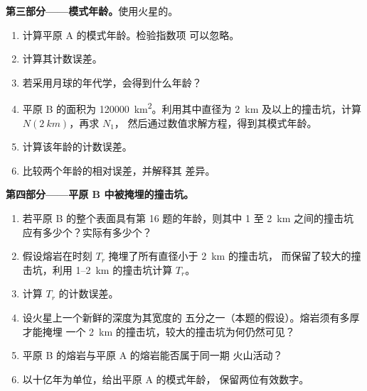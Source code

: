 \begin{problem}
\medskip\noindent\textbf{第三部分——模式年龄。}使用火星的。
\begin{enumerate}[resume]
\item 计算平原 A 的模式年龄。检验指数项
  可以忽略。
\item 计算其计数误差。
\item 若采用月球的年代学，会得到什么年龄？
\item 平原 B 的面积为 \qty{120000}{km^2}。利用其中直径为
  \qty{2}{km} 及以上的撞击坑，计算 $N(\qty{2}{km})$，再求 $N_1$，
  然后通过数值求解方程，得到其模式年龄。
\item 计算该年龄的计数误差。
\item 比较两个年龄的相对误差，并解释其
  差异。
\end{enumerate}

\medskip\noindent\textbf{第四部分——平原 B 中被掩埋的撞击坑。}
\begin{enumerate}[resume]
\item 若平原 B 的整个表面具有第 16 题的年龄，则其中 1 至 \qty{2}{km} 之间的撞击坑
  应有多少个？实际有多少个？
\item 假设熔岩在时刻 $T_r$ 掩埋了所有直径小于 \qty{2}{km} 的撞击坑，
  而保留了较大的撞击坑，利用
  \num{1}--\qty{2}{km} 的撞击坑计算 $T_r$。
\item 计算 $T_r$ 的计数误差。
\item 设火星上一个新鲜的深度为其宽度的
  五分之一（本题的假设）。熔岩须有多厚才能掩埋
  一个 \qty{2}{km} 的撞击坑，较大的撞击坑为何仍然可见？
\item 平原 B 的熔岩与平原 A 的熔岩能否属于同一期
  火山活动？
\item 以十亿年为单位，给出平原 A 的模式年龄，
  保留两位有效数字。
\end{enumerate}
\end{problem}
